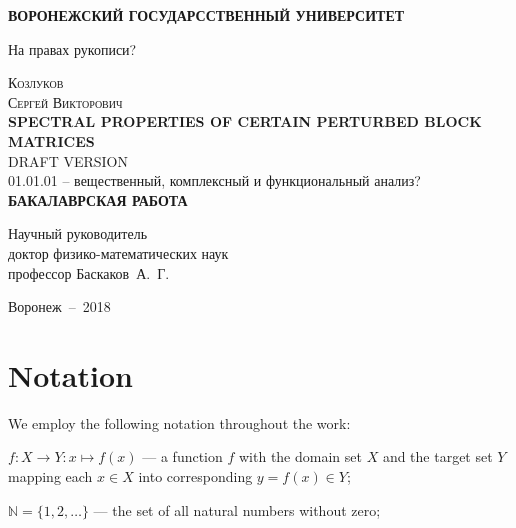 \documentclass[14pt,a4paper]{extarticle}
\theoremstyle{definition}
\begin{document}

\newpage

\begin{center}
  \textbf{ВОРОНЕЖСКИЙ ГОСУДАРССТВЕННЫЙ УНИВЕРСИТЕТ}
\end{center}

\begin{flushright}
  На правах рукописи?
\end{flushright}

\vfill

\begin{center}
  \textsc{\Large
    Козлуков\\
    Сергей Викторович
  }
  \\[1.5cm]
  \textbf{SPECTRAL PROPERTIES OF CERTAIN PERTURBED BLOCK MATRICES}\\[.5cm]
  {\Huge DRAFT VERSION}\\[1.5cm]
  01.01.01 -- вещественный, комплексный и функциональный анализ?\\[1.5cm]
  \textbf{БАКАЛАВРСКАЯ РАБОТА}
\end{center}

\vfill
\begin{flushright}
  Научный руководитель\\
  доктор физико-математических наук\\
  профессор Баскаков~А.~Г.
\end{flushright}
 
\vfill
\begin{center}
  Воронеж~--~2018
\end{center}

\pagestyle{empty}
\newpage

\setcounter{tocdepth}{2}
\tableofcontents
\newpage


\section*{Notation}

We employ the following notation throughout the work:

\( f: X\to Y: x\mapsto f(x) \) --- a function \( f \)
with the domain set \( X \) and the target set \( Y \)
mapping each \( x\in X \) into corresponding \( y=f(x) \in Y\);

\( \mathbb{N} = \{ 1, 2, \ldots \}\) --- the set of all natural numbers without zero;
\end{document}
